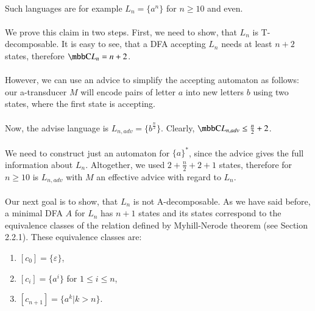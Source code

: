 \paragraph{}
\dokaz Such languages are for example $L_{n} = \{ a^n \}$ for $n \geq 10$ and even.

\paragraph{}
We prove this claim in two steps. First, we need to show, that $L_{n}$ is T-decomposable. It is easy to see, that  a DFA accepting $L_{n}$ needs at least $n +2$ states, therefore $\C{L_n} = n + 2$.

\paragraph{}
However, we can use an advice to simplify the accepting automaton as follows: our a-transducer $M$ will encode pairs of letter $a$ into new letters $b$ using two states, where the first state is accepting.

\paragraph{}
Now, the advise language is $L_{n,adv} = \{ b^{\frac{n}{2}} \}$. Clearly, $\C{L_{n,adv}} \leq \frac{n}{2} + 2$.

\paragraph{}
We need to construct just an automaton for $\{a\}^*$, since the advice gives the full information about $L_n$. Altogether, we used $2 + \frac{n}{2}+2+1$ states, therefore for $n \geq 10$ is $L_{n,adv}$ with $M$ an effective advice with regard to $L_n$.

\paragraph{}
Our next goal is to show, that $L_n$ is not A-decomposable. As we have said before, a minimal DFA $A$ for $L_n$ has $n+1$ states and its states correspond to the equivalence classes of the relation defined by Myhill-Nerode theorem (see Section 2.2.1). These equivalence classes are:
\begin{enumerate}
\item $[c_0] = \{ \varepsilon \}$,
\item $[c_{i}] = \{ a^i \}$ for $1 \leq i \leq n$,
\item $[c_{n+1}] = \{ a^k | k > n \}$.
\end{enumerate}

